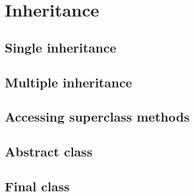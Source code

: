 \documentclass{KodeBook}
\begin{document}
	
\fi

\chapter{Inheritance}


\section{Single inheritance}


\section{Multiple inheritance}


\section{Accessing superclass methods}


\section{Abstract class}

\section{Final class}



\ifx\wholebook\relax\else
% 
% 
	
\end{document}
